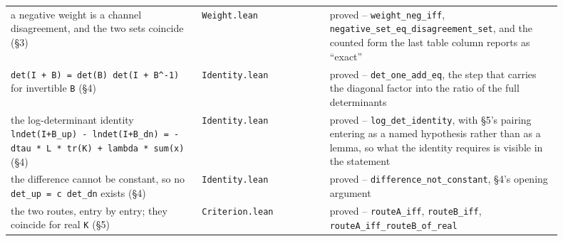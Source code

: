 \documentclass[10pt,letterpaper,twocolumn]{article}
\begin{document}
\begin{center}
{\footnotesize
{}
\tabletail{\midrule}
\tablelasttail{\bottomrule}
\begin{xtabular}{L{0.264\linewidth}L{0.228\linewidth}L{0.405\linewidth}}
a negative weight is a channel disagreement, and the two sets coincide
(§3) & \texttt{Weight.\allowbreak{}lean} & proved -- \texttt{weight\_\allowbreak{}neg\_\allowbreak{}iff},
\texttt{negative\_\allowbreak{}set\_\allowbreak{}eq\_\allowbreak{}disagreement\_\allowbreak{}set},
and the counted form the last table column reports as ``exact'' \\
\texttt{det(\allowbreak{}I\ +\allowbreak{}\ B)\allowbreak{}\ =\allowbreak{}\ det(\allowbreak{}B)\allowbreak{}\ det(\allowbreak{}I\ +\allowbreak{}\ B\^{}-{}\allowbreak{}1)\allowbreak{}}
for invertible \texttt{B} (§4) & \texttt{Identity.\allowbreak{}lean} & proved --
\texttt{det\_\allowbreak{}one\_\allowbreak{}add\_\allowbreak{}eq}, the
step that carries the diagonal factor into the ratio of the full
determinants \\
the log-determinant identity
\texttt{ln\textbar{}\allowbreak{}det(\allowbreak{}I+\allowbreak{}B\_\allowbreak{}up)\allowbreak{}\textbar{}\allowbreak{}\ -{}\allowbreak{}\ ln\textbar{}\allowbreak{}det(\allowbreak{}I+\allowbreak{}B\_\allowbreak{}dn)\allowbreak{}\textbar{}\allowbreak{}\ =\allowbreak{}\ -{}\allowbreak{}dtau\ *\allowbreak{}\ L\ *\allowbreak{}\ tr(\allowbreak{}K)\allowbreak{}\ +\allowbreak{}\ lambda\ *\allowbreak{}\ sum(\allowbreak{}x)\allowbreak{}}
(§4) & \texttt{Identity.\allowbreak{}lean} & proved -- \texttt{log\_\allowbreak{}det\_\allowbreak{}identity}, with
§5's pairing entering as a named hypothesis rather than as a lemma, so
what the identity requires is visible in the statement \\
the difference cannot be constant, so no
\texttt{det\_\allowbreak{}up\ =\allowbreak{}\ c\ det\_\allowbreak{}dn}
exists (§4) & \texttt{Identity.\allowbreak{}lean} & proved -- \texttt{difference\_\allowbreak{}not\_\allowbreak{}constant},
§4's opening argument \\
the two routes, entry by entry; they coincide for real \texttt{K} (§5) & \texttt{Criterion.\allowbreak{}lean} & proved -- \texttt{routeA\_\allowbreak{}iff},
\texttt{routeB\_\allowbreak{}iff},
\texttt{routeA\_\allowbreak{}iff\_\allowbreak{}routeB\_\allowbreak{}of\_\allowbreak{}real} \\

\end{xtabular}}
\end{center}
\end{document}
